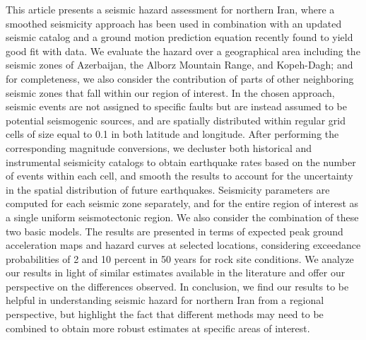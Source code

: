 % 
This article presents a seismic hazard assessment for northern Iran, where a smoothed seismicity approach has been used in combination with an updated seismic catalog and a ground motion prediction equation recently found to yield good fit with data. We evaluate the hazard over a geographical area including the seismic zones of Azerbaijan, the Alborz Mountain Range, and Kopeh-Dagh; and for completeness, we also consider the contribution of parts of other neighboring seismic zones that fall within our region of interest. In the chosen approach, seismic events are not assigned to specific faults but are instead assumed to be potential seismogenic sources, and are spatially distributed within regular grid cells of size equal to 0.1\textdegree{} in both latitude and longitude. After performing the corresponding magnitude conversions, we decluster both historical and instrumental seismicity catalogs to obtain earthquake rates based on the number of events within each cell, and smooth the results to account for the uncertainty in the spatial distribution of future earthquakes. Seismicity parameters are computed for each seismic zone separately, and for the entire region of interest as a single uniform seismotectonic region. We also consider the combination of these two basic models. The results are presented in terms of expected peak ground acceleration maps and hazard curves at selected locations, considering exceedance probabilities of 2 and 10 percent in 50 years for rock site conditions.  We analyze our results in light of similar estimates available in the literature and offer our perspective on the differences observed. In conclusion, we find our results to be helpful in understanding seismic hazard for northern Iran from a regional perspective, but highlight the fact that different methods may need to be combined to obtain more robust estimates at specific areas of interest.

